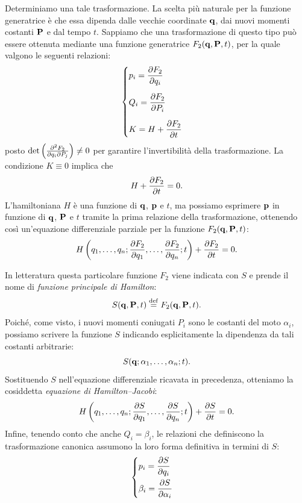 Determiniamo una tale trasformazione. La scelta più naturale per la funzione generatrice è che essa dipenda dalle vecchie coordinate $\vb{q}$, dai nuovi momenti costanti $\vb{P}$ e dal tempo $t$. Sappiamo che una trasformazione di questo tipo può essere ottenuta mediante una funzione generatrice $F_2(\vb{q},\vb{P},t)$, per la quale valgono le seguenti relazioni:
\begin{equation*}
    \begin{cases}
        \displaystyle p_i = \pdv{F_2}{q_i} \\[0.5cm]
        \displaystyle Q_i = \pdv{F_2}{P_i} \\[0.5cm]
        \displaystyle K = H + \pdv{F_2}{t}
    \end{cases}
\end{equation*}
posto $\det \left( \pdv[2]{F_2}{q_i}{P_j} \right) \neq 0$ per garantire l'invertibilità della trasformazione. La condizione $K \equiv 0$ implica che
\begin{equation}
    \label{eq:hamiltonjacobi-1}
    H + \pdv{F_2}{t} = 0.
\end{equation}
L'hamiltoniana $H$ è una funzione di $\vb{q}$, $\vb{p}$ e $t$, ma possiamo esprimere $\vb{p}$ in funzione di $\vb{q}$, $\vb{P}$ e $t$ tramite la prima relazione della trasformazione, ottenendo così un'equazione differenziale parziale per la funzione $F_2(\vb{q},\vb{P},t)$:
\begin{equation*}
    H\left( q_1, \dots, q_n; \pdv{F_2}{q_1}, \dots, \pdv{F_2}{q_n}; t \right) + \pdv{F_2}{t} = 0.
\end{equation*}

In letteratura questa particolare funzione $F_2$ viene indicata con $S$ e prende il nome di \emph{funzione principale di Hamilton}:
\begin{equation*}
    S(\vb{q},\vb{P},t) \overset{\mathrm{def}}{=} F_2(\vb{q},\vb{P},t).
\end{equation*}
Poiché, come visto, i nuovi momenti coniugati $P_i$ sono le costanti del moto $\alpha_i$, possiamo scrivere la funzione $S$ indicando esplicitamente la dipendenza da tali costanti arbitrarie:
\begin{equation*}
    S(\vb{q};\alpha_1, \dots, \alpha_n; t).
\end{equation*}
Sostituendo $S$ nell'equazione differenziale ricavata in precedenza, otteniamo la cosiddetta \emph{equazione di Hamilton--Jacobi}:
\begin{equation*}
    H\left( q_1, \dots, q_n; \pdv{S}{q_1}, \dots, \pdv{S}{q_n}; t \right) + \pdv{S}{t} = 0.
\end{equation*}
Infine, tenendo conto che anche $Q_i = \beta_i$, le relazioni che definiscono la trasformazione canonica assumono la loro forma definitiva in termini di $S$:
\begin{equation*}
    \begin{cases}
        \displaystyle p_i = \pdv{S}{q_i} \\[0.3cm]
        \displaystyle \beta_i = \pdv{S}{\alpha_i}
    \end{cases}
\end{equation*}

